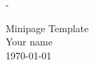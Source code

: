 -

 \begin{minipage}{5in} %
 	\Large Minipage Template \\
 	\large Your name \\
 	\today \\[1.5em] %
 \end{minipage}
